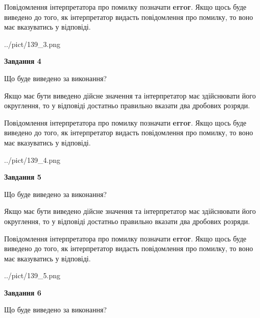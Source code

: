 \documentclass[12pt, ukrainian]{article}
\begin{document}
{\begin {Large}
Повідомлення інтерпретатора про помилку позначати \textbf{error}.
Якщо щось буде виведено до того, як інтерпретатор видасть повідомлення про помилку, 
то воно має вказуватись у відповіді. \par

\begin{center}
	{../pict/139_3.png}
\end{center}
\newpage

{\begin {center}\textbf{Завдання 4}\end {center}}\par
Що буде виведено за виконання? \par

Якщо має бути виведено дійсне значення та інтерпретатор має здійснювати його округлення, 
то у відповіді достатньо правильно вказати два дробових розряди.

Повідомлення інтерпретатора про помилку позначати \textbf{error}.
Якщо щось буде виведено до того, як інтерпретатор видасть повідомлення про помилку, 
то воно має вказуватись у відповіді. \par

\begin{center}
	{../pict/139_4.png}
\end{center}
\newpage

{\begin {center}\textbf{Завдання 5}\end {center}}\par
Що буде виведено за виконання? \par

Якщо має бути виведено дійсне значення та інтерпретатор має здійснювати його округлення, 
то у відповіді достатньо правильно вказати два дробових розряди.

Повідомлення інтерпретатора про помилку позначати \textbf{error}.
Якщо щось буде виведено до того, як інтерпретатор видасть повідомлення про помилку, 
то воно має вказуватись у відповіді. \par

\begin{center}
	{../pict/139_5.png}
\end{center}
\newpage

{\begin {center}\textbf{Завдання 6}\end {center}}\par
Що буде виведено за виконання? \par


\end{Large}}
\end{document}

